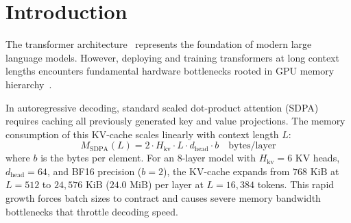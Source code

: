 \documentclass[10pt,twocolumn,letterpaper]{article}
\begin{document}
\begin{abstract}
FLOPs saved); (4) \textbf{Chunked Vocabulary-Projection Cross-Entropy \& Stream-Pipelined Parallelism}, reducing peak loss VRAM by $98.5\%$ vs.\ PyTorch ($94.1\%$ vs.\ genuine \texttt{unsloth 2026.10.10} at $V=32,000$), accelerating SwiGLU by $1.95\times$, overlapping DMA prefetch ($812,956\text{ tok/s}$), and reaching $6.7\%$ higher LoRA throughput than Unsloth ($25,973$ vs.\ $24,344\text{ tok/s}$); and (5) \textbf{Activation-Checkpointed \texttt{LayerStreamingEngine} \& HuggingFace Bridge}, reducing 102M--271M training VRAM by $76.4\%\text{--}83.8\%$ (executing $1.97\times$ faster than WDDM paging spill at $271\text{M}$), fitting $695\text{M}$ ($2,115.73\text{ MB}$) and $1.52\text{B} + \text{CentroidSteer}$ ($3,132.62\text{ MB}$ allocated / $6,248.0\text{ MB}$ reserved) dense/MoE pre-training inside an $8\text{ GB}$ consumer laptop GPU, and exporting standard \texttt{TriuneForCausalLM} / early-exit adapters for open-weights models. On the complete $90.79\text{M}$ ($64.21\text{M}$ active/token) checkpoint, Triune sustains $181,150\text{ tok/s}$ ($B=1$) and $297,753\text{ tok/s}$ ($B=4$) full-model prefill at $L=16,384$ (peaking at $383,135\text{ tok/s}$ at $B=32, T=1024$) and $157\text{ tok/s}$ sequential tensor decode.
\end{abstract}

\section{Introduction}

The transformer architecture~\cite{vaswani2017attention} represents the foundation of modern large language models. However, deploying and training transformers at long context lengths encounters fundamental hardware bottlenecks rooted in GPU memory hierarchy~\cite{dao2022flashattention,dao2023flashattention2,williams2009roofline}. 

In autoregressive decoding, standard scaled dot-product attention (SDPA) requires caching all previously generated key and value projections. The memory consumption of this KV-cache scales linearly with context length $L$:
\begin{equation}
    M_{\text{SDPA}}(L) = 2 \cdot H_{\text{kv}} \cdot L \cdot d_{\text{head}} \cdot b \quad \text{bytes/layer}
\end{equation}
where $b$ is the bytes per element. For an 8-layer model with $H_{\text{kv}}=6$ KV heads, $d_{\text{head}}=64$, and BF16 precision ($b=2$), the KV-cache expands from $768\text{ KiB}$ at $L=512$ to $24,576\text{ KiB}$ ($24.0\text{ MiB}$) per layer at $L=16,384$ tokens. This rapid growth forces batch sizes to contract and causes severe memory bandwidth bottlenecks that throttle decoding speed.
\end{document}
